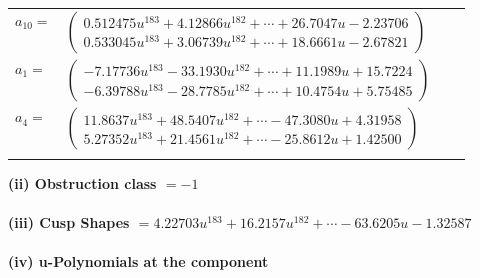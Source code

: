 \documentclass[1p]{elsarticle_modified}
\theoremstyle{definition}
\begin{document}
\begin{tabular}{m{7pt} m{180pt} m{7pt} m{180pt} }
\flushright $a_{10}=$&$\begin{pmatrix}0.512475 u^{183}+4.12866 u^{182}+\cdots+26.7047 u-2.23706\\0.533045 u^{183}+3.06739 u^{182}+\cdots+18.6661 u-2.67821\end{pmatrix}$ \\
\flushright $a_{1}=$&$\begin{pmatrix}-7.17736 u^{183}-33.1930 u^{182}+\cdots+11.1989 u+15.7224\\-6.39788 u^{183}-28.7785 u^{182}+\cdots+10.4754 u+5.75485\end{pmatrix}$ \\
\flushright $a_{4}=$&$\begin{pmatrix}11.8637 u^{183}+48.5407 u^{182}+\cdots-47.3080 u+4.31958\\5.27352 u^{183}+21.4561 u^{182}+\cdots-25.8612 u+1.42500\end{pmatrix}$\\&\end{tabular}
\flushleft \textbf{(ii) Obstruction class $= -1$}\\~\\
\flushleft \textbf{(iii) Cusp Shapes $= 4.22703 u^{183}+16.2157 u^{182}+\cdots-63.6205 u-1.32587$}\\~\\
\newpage\renewcommand{\arraystretch}{1}
\flushleft \textbf{(iv) u-Polynomials at the component}\newline \\
\end{document}
